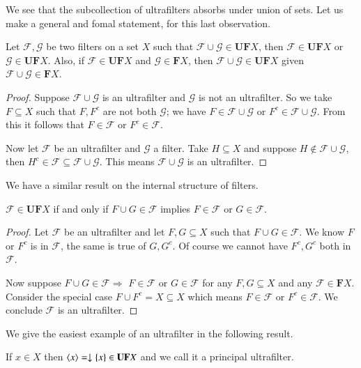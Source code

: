 \documentclass [12pt]{book}
\begin{document}
We see that the subcollection of ultrafilters absorbs under union of sets. Let us make a general and fomal statement, for this last observation.

\begin{theorem}Let $\mathcal F,\mathcal G$ be two filters on a set $X$ such that $\mathcal F\cup\mathcal G\in\textbf{UF}X$, then $\mathcal F\in\textbf{UF}X$ or $\mathcal G\in\textbf{UF}X$. Also, if $\mathcal F\in\textbf{UF}X$ and $\mathcal G\in\textbf{F}X$, then $\mathcal F\cup\mathcal G\in\textbf{UF}X$ given $\mathcal F\cup\mathcal G\in\textbf{F}X$.\end{theorem}

\begin{proof}Suppose $\mathcal F\cup\mathcal G$ is an ultrafilter and $\mathcal G$ is not an ultrafilter. So we take $F\subseteq X$ such that $F,F^c$ are not both $\mathcal G$; we have $F\in\mathcal F\cup\mathcal G$ or $F^c\in\mathcal F\cup\mathcal G$. From this it follows that $F\in\mathcal F$ or $F^c\in\mathcal F$.

Now let $\mathcal F$ be an ultrafilter and $\mathcal G$ a filter. Take $H\subseteq X$ and suppose $H\notin\mathcal F\cup\mathcal G$, then $H^c\in\mathcal F\subseteq\mathcal F\cup\mathcal G$. This means $\mathcal F\cup\mathcal G$ is an ultrafilter.\end{proof}

We have a similar result on the internal structure of filters.

\begin{proposition}$\mathcal F\in\textbf{UF}X$ if and only if $F\cup G\in\mathcal F$ implies $F\in\mathcal F$ or $G\in\mathcal F$.\end{proposition}

\begin{proof}Let $\mathcal F$ be an ultrafilter and let $F,G\subseteq X$ such that $F\cup G\in\mathcal F$. We know $F$ or $F^c$ is in $\mathcal F$, the same is true of $G,G^c$. Of course we cannot have $F^c,G^c$ both in $\mathcal F$.

Now suppose $F\cup G\in\mathcal F\Rightarrow$ $F\in\mathcal F$ or $G\in\mathcal F$ for any $F,G\subseteq X$ and any $\mathcal F\in\textbf{F}X$. Consider the special case $F\cup F^c=X\subseteq X$ which means $F\in\mathcal F$ or $F^c\in\mathcal F$. We conclude $\mathcal F$ is an ultrafilter.\end{proof}

We give the easiest example of an ultrafilter in the following result.

\begin{proposition}If $x\in X$ then $\langle x\rangle=\downarrow\mathcal\{x\}\in\textbf{UF}X$ and we call it a principal ultrafilter.\end{proposition}
\end{document}
